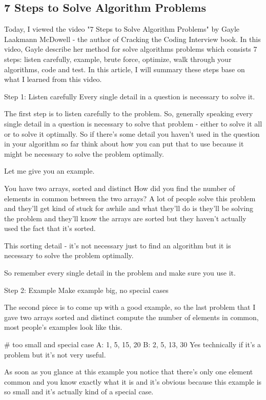\subsection{7 Steps to Solve Algorithm Problems}

Today, I viewed the video "7 Steps to Solve Algorithm Problems" by Gayle Laakmann McDowell - the author of Cracking the Coding Interview book. In this video, Gayle describe her method for solve algorithms problems which consists 7 steps: listen carefully, example, brute force, optimize, walk through your algorithms, code and test. In this article, I will summary these steps base on what I learned from this video.

Step 1: Listen carefully
Every single detail in a question is necessary to solve it.

The first step is to listen carefully to the problem. So, generally speaking every single detail in a question is necessary to solve that problem - either to solve it all or to solve it optimally. So if there's some detail you haven't used in the question in your algorithm so far think about how you can put that to use because it might be necessary to solve the problem optimally.

Let me give you an example.

You have two arrays, sorted and distinct
How did you find the number of elements in common between the two arrays?
A lot of people solve this problem and they'll get kind of stuck for awhile and what they'll do is they'll be solving the problem and they'll know the arrays are sorted but they haven't actually used the fact that it's sorted.

This sorting detail - it's not necessary just to find an algorithm but it is necessary to solve the problem optimally.

So remember every single detail in the problem and make sure you use it.

Step 2: Example
Make example big, no special cases

The second piece is to come up with a good example, so the last problem that I gave two arrays sorted and distinct compute the number of elements in common, most people's examples look like this.

# too small and special case
A: 1, 5, 15, 20
B: 2, 5, 13, 30
Yes technically if it's a problem but it's not very useful.

As soon as you glance at this example you notice that there's only one element common and you know exactly what it is and it's obvious because this example is so small and it's actually kind of a special case.

